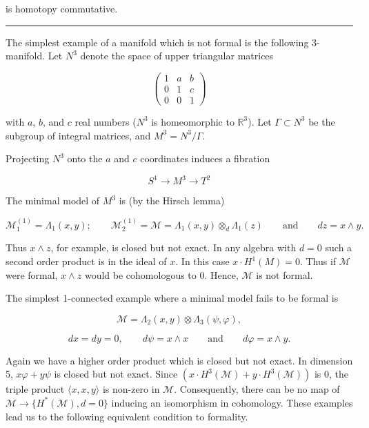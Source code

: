 \documentclass[
  english,
  a3paper,
  a3paper]{extarticle}
\begin{document}
is homotopy commutative.

\clearpage



\par

\vspace{0.7mm}\hrule\vspace{1.6mm}

\fontsize{9}{11}\selectfont

The simplest example of a manifold which is not formal is the following
3-manifold. Let \(N^3\) denote the space of upper triangular matrices

\[\begin{pmatrix}1&a&b\\0&1&c\\0&0&1\end{pmatrix}\]

with \(a\), \(b\), and \(c\) real numbers (\(N^3\) is homeomorphic to
\(\mathbb R^3\)). Let \(\Gamma\subset N^3\) be the subgroup of integral
matrices, and \(M^3=N^3/\Gamma\).

Projecting \(N^3\) onto the \(a\) and \(c\) coordinates induces a
fibration

\[S^1\to M^3\to T^2\]

The minimal model of \(M^3\) is (by the Hirsch lemma)

\[\mathcal M_1^{(1)}=\Lambda_1(x,y);\qquad\mathcal M_2^{(1)}=\mathcal M=\Lambda_1(x,y)\otimes_d\Lambda_1(z)\qquad\text{and}\qquad dz=x\wedge y.\]

Thus \(x\wedge z\), for example, is closed but not exact. In any algebra
with \(d=0\) such a second order product is in the ideal of \(x\). In
this case \(x\cdot H^1(M)=0\). Thus if \(\mathcal M\) were formal,
\(x\wedge z\) would be cohomologous to 0. Hence, \(\mathcal M\) is not
formal.

The simplest 1-connected example where a minimal model fails to be
formal is

\[\mathcal M=\Lambda_2(x,y)\otimes\Lambda_3(\psi,\varphi),\]

\[dx=dy=0,\qquad d\psi=x\wedge x\qquad\text{and}\qquad d\varphi=x\wedge y.\]

Again we have a higher order product which is closed but not exact. In
dimension 5, \(x\varphi+y\psi\) is closed but not exact. Since
\((x\cdot H^3(\mathcal M)+y\cdot H^3(\mathcal M))\) is 0, the triple
product \(\langle x,x,y\rangle\) is non-zero in \(\mathcal M\).
Consequently, there can be no map of
\(\mathcal M\to\{H^*(\mathcal M),d=0\}\) inducing an isomorphism in
cohomology. These examples lead us to the following equivalent condition
to formality.
\end{document}
